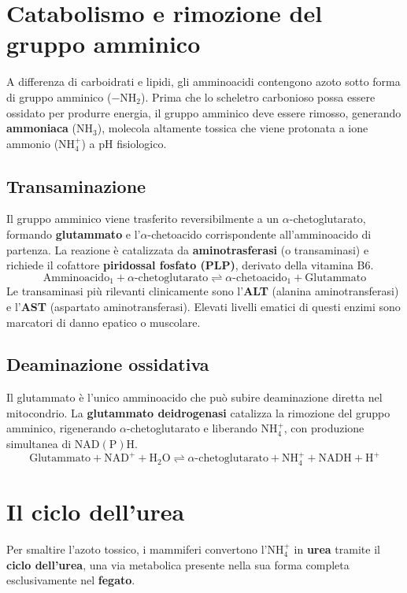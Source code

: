 \documentclass[12pt,a4paper]{report}
\begin{document}
\section{Catabolismo e rimozione del gruppo amminico}
A differenza di carboidrati e lipidi, gli amminoacidi contengono azoto sotto forma di gruppo amminico (\(-\mathrm{NH_2}\)). Prima che lo scheletro carbonioso possa essere ossidato per produrre energia, il gruppo amminico deve essere rimosso, generando \textbf{ammoniaca} (\(\mathrm{NH_3}\)), molecola altamente tossica che viene protonata a ione ammonio (\(\mathrm{NH_4^+}\)) a pH fisiologico.
\subsection{Transaminazione}
Il gruppo amminico viene trasferito reversibilmente a un \(\alpha\)-chetoglutarato, formando \textbf{glutammato} e l'\(\alpha\)-chetoacido corrispondente all'amminoacido di partenza. La reazione è catalizzata da \textbf{aminotrasferasi} (o transaminasi) e richiede il cofattore \textbf{piridossal fosfato (PLP)}, derivato della vitamina B6.
\[
\text{Amminoacido}_1 + \alpha\text{-chetoglutarato} \rightleftharpoons \alpha\text{-chetoacido}_1 + \text{Glutammato}
\]
Le transaminasi più rilevanti clinicamente sono l'\textbf{ALT} (alanina aminotransferasi) e l'\textbf{AST} (aspartato aminotransferasi). Elevati livelli ematici di questi enzimi sono marcatori di danno epatico o muscolare.
\subsection{Deaminazione ossidativa}
Il glutammato è l'unico amminoacido che può subire deaminazione diretta nel mitocondrio. La \textbf{glutammato deidrogenasi} catalizza la rimozione del gruppo amminico, rigenerando \(\alpha\)-chetoglutarato e liberando \(\mathrm{NH_4^+}\), con produzione simultanea di \(\mathrm{NAD(P)H}\).
\[
\text{Glutammato} + \mathrm{NAD^+} + \mathrm{H_2O} \rightleftharpoons \alpha\text{-chetoglutarato} + \mathrm{NH_4^+} + \mathrm{NADH} + \mathrm{H^+}
\]

\section{Il ciclo dell'urea}
Per smaltire l'azoto tossico, i mammiferi convertono l'\(\mathrm{NH_4^+}\) in \textbf{urea} tramite il \textbf{ciclo dell'urea}, una via metabolica presente nella sua forma completa esclusivamente nel \textbf{fegato}.
\end{document}

